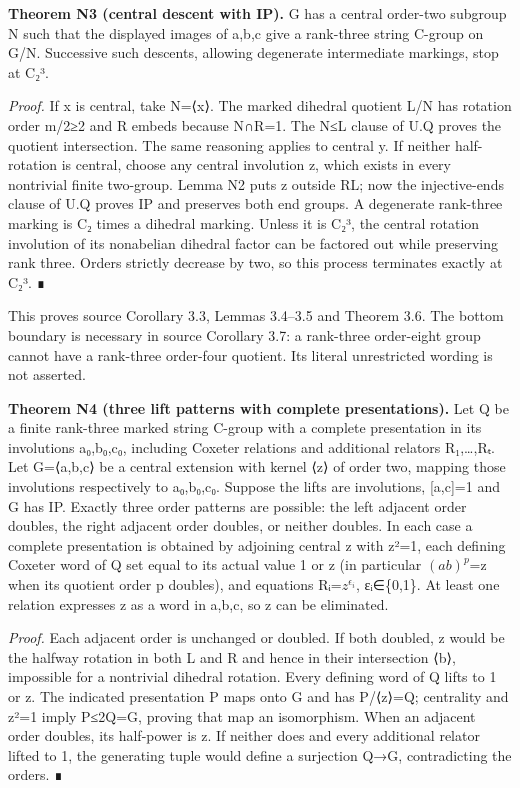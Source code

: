 \documentclass[
  11pt,
  a4paper,
]{article}
\begin{document}
\textbf{Theorem N3 (central descent with IP).} G has a central order-two
subgroup N such that the displayed images of a,b,c give a rank-three
string C-group on G/N. Successive such descents, allowing degenerate
intermediate markings, stop at C₂³.

\emph{Proof.} If x is central, take N=⟨x⟩. The marked dihedral quotient
L/N has rotation order m/2≥2 and R embeds because N∩R=1. The N≤L clause
of U.Q proves the quotient intersection. The same reasoning applies to
central y. If neither half-rotation is central, choose any central
involution z, which exists in every nontrivial finite two-group. Lemma
N2 puts z outside RL; now the injective-ends clause of U.Q proves IP and
preserves both end groups. A degenerate rank-three marking is C₂ times a
dihedral marking. Unless it is C₂³, the central rotation involution of
its nonabelian dihedral factor can be factored out while preserving rank
three. Orders strictly decrease by two, so this process terminates
exactly at C₂³. ∎

This proves source Corollary 3.3, Lemmas 3.4--3.5 and Theorem 3.6. The
bottom boundary is necessary in source Corollary 3.7: a rank-three
order-eight group cannot have a rank-three order-four quotient. Its
literal unrestricted wording is not asserted.

\textbf{Theorem N4 (three lift patterns with complete presentations).}
Let Q be a finite rank-three marked string C-group with a complete
presentation in its involutions a₀,b₀,c₀, including Coxeter relations
and additional relators R₁,\ldots,Rₜ. Let G=⟨a,b,c⟩ be a central
extension with kernel ⟨z⟩ of order two, mapping those involutions
respectively to a₀,b₀,c₀. Suppose the lifts are involutions, {[}a,c{]}=1
and G has IP. Exactly three order patterns are possible: the left
adjacent order doubles, the right adjacent order doubles, or neither
doubles. In each case a complete presentation is obtained by adjoining
central z with z²=1, each defining Coxeter word of Q set equal to its
actual value 1 or z (in particular \((ab)^{p}\)=z when its quotient
order p doubles), and equations Rᵢ=\(z^{\epsilon _i}\), εᵢ∈\{0,1\}. At
least one relation expresses z as a word in a,b,c, so z can be
eliminated.

\emph{Proof.} Each adjacent order is unchanged or doubled. If both
doubled, z would be the halfway rotation in both L and R and hence in
their intersection ⟨b⟩, impossible for a nontrivial dihedral rotation.
Every defining word of Q lifts to 1 or z. The indicated presentation P
maps onto G and has P/⟨z⟩=Q; centrality and z²=1 imply
\textbar P\textbar≤2\textbar Q\textbar=\textbar G\textbar, proving that
map an isomorphism. When an adjacent order doubles, its half-power is z.
If neither does and every additional relator lifted to 1, the generating
tuple would define a surjection Q→G, contradicting the orders. ∎
\end{document}
